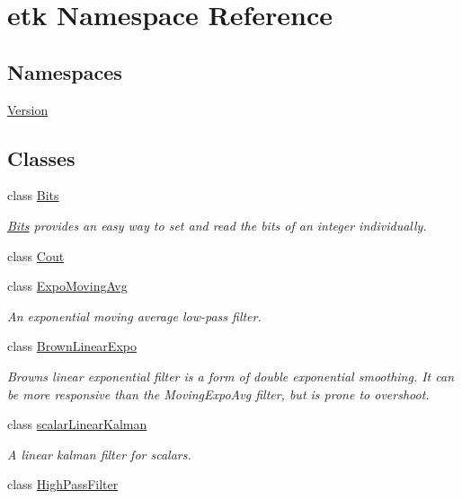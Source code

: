 \hypertarget{namespaceetk}{\section{etk Namespace Reference}
\label{namespaceetk}
}
\subsection*{Namespaces}
\begin{DoxyCompactItemize}
\item 
\hyperlink{namespaceetk_1_1_version}{Version}
\end{DoxyCompactItemize}
\subsection*{Classes}
\begin{DoxyCompactItemize}
\item 
class \hyperlink{classetk_1_1_bits}{Bits}
\begin{DoxyCompactList}\small\item\em \hyperlink{classetk_1_1_bits}{Bits} provides an easy way to set and read the bits of an integer individually. \end{DoxyCompactList}\item 
class \hyperlink{classetk_1_1_cout}{Cout}
\item 
class \hyperlink{classetk_1_1_expo_moving_avg}{Expo\-Moving\-Avg}
\begin{DoxyCompactList}\small\item\em An exponential moving average low-\/pass filter. \end{DoxyCompactList}\item 
class \hyperlink{classetk_1_1_brown_linear_expo}{Brown\-Linear\-Expo}
\begin{DoxyCompactList}\small\item\em Browns linear exponential filter is a form of double exponential smoothing. It can be more responsive than the Moving\-Expo\-Avg filter, but is prone to overshoot. \end{DoxyCompactList}\item 
class \hyperlink{classetk_1_1scalar_linear_kalman}{scalar\-Linear\-Kalman}
\begin{DoxyCompactList}\small\item\em A linear kalman filter for scalars. \end{DoxyCompactList}\item 
class \hyperlink{classetk_1_1_high_pass_filter}{High\-Pass\-Filter}

\end{DoxyCompactItemize}
